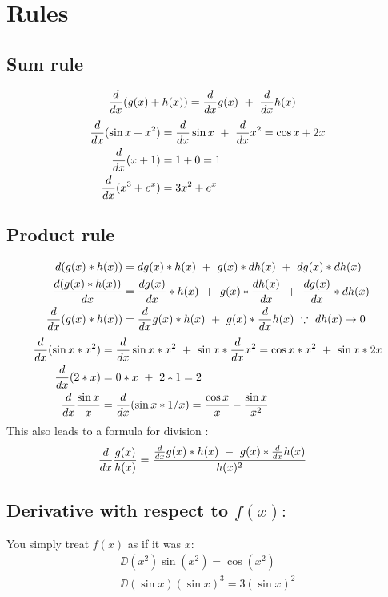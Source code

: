 \documentclass[a4paper,14pt,twoside]{book}
\begin{document}
{\section{Rules} \label{sec:Rules}
\subsection{Sum rule}
\begin{align*}
	\frac{d}{dx} (g(x) + h(x)) & = \frac{d}{dx} g(x)\ +\ \frac{d}{dx} h(x)
\end{align*}
\begin{align*}
	\frac{d}{dx} (\sin{x} + x^2) & = \frac{d}{dx} \sin{x}\ +\ \frac{d}{dx} x^2 = \cos{x} + 2x \\
	\frac{d}{dx} (x + 1)         & = 1 + 0 = 1                            \\
	\frac{d}{dx} (x^3 + e^x)     & = 3x^2 + e^x
\end{align*}
\pagebreak
\subsection{Product rule}
\begin{align*}
	d(g(x) * h(x))        & = dg(x)*h(x)\ +\ g(x)*dh(x)\ +\ dg(x)*dh(x)                      \\
	\DD{(g(x) * h(x))}{x} & = \DD{g(x)}{x}*h(x)\ +\ g(x)*\DD{h(x)}{x}\ +\ \DD{g(x)}{x}*dh(x) \\
	\D (g(x) * h(x))      & = \D g(x) * h(x)\ +\ g(x) * \D h(x)\ \because\ dh(x) \to 0
\end{align*}
\begin{align*}
	\frac{d}{dx} (\sin{x} * x^2)
	 & = \frac{d}{dx} \sin{x} * x^2\ +\ \sin{x} * \frac{d}{dx} x^2
	= \cos{x} * x^2\ +\ \sin{x} * 2x           \\
	\frac{d}{dx} (2 * x)
	 & = 0 * x\ +\ 2 * 1
	= 2                                        \\
	\frac{d}{dx} \frac{\sin{x}}{x}
	 & = \frac{d}{dx} (\sin{x} * 1/x)
	= \frac{\cos{x}}{x} - \frac{\sin{x}}{x^2}
\end{align*}
This also leads to a formula for division $:$
\begin{align*}
	\frac{d}{dx} \frac{g(x)}{h(x)} & = \frac{\frac{d}{dx} g(x) * h(x)\ -\ g(x) * \frac{d}{dx} h(x)}{h(x)^2}
\end{align*}
\pagebreak
\subsection{Derivative with respect to $f(x):$}
You simply treat $f(x)$ as if it was $x:$
\begin{align*}
	\DD{}{(x^2)} \sin{(x^2)}
	= \cos{(x^2)}  \\
	\DD{}{(\sin{x})} (\sin{x})^3
	= 3(\sin{x})^2 \\
\end{align*}
}
\end{document}

